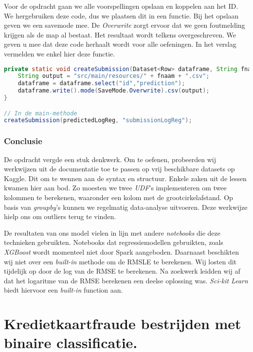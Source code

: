 \documentclass[a4paper,10pt,twoside]{report}
\begin{document}
Voor de opdracht gaan we alle voorspellingen opslaan en koppelen aan het ID. We hergebruiken deze code, dus we plaatsen dit in een functie. Bij het opslaan geven we een savemode mee. De \textit{Overwrite} zorgt ervoor dat we geen foutmelding krijgen als de map al bestaat. Het resultaat wordt telkens overgeschreven. We geven u mee dat deze code herhaalt wordt voor alle oefeningen. In het verslag vermelden we enkel hier deze functie.

\begin{lstlisting}[language=Java]
private static void createSubmission(Dataset<Row> dataframe, String fnaam) {
	String output = "src/main/resources/" + fnaam + ".csv";
	dataframe = dataframe.select("id","prediction");
	dataframe.write().mode(SaveMode.Overwrite).csv(output);
}

// In de main-methode
createSubmission(predictedLogReg, "submissionLogReg");
\end{lstlisting}

\subsection*{Conclusie}

De opdracht vergde een stuk denkwerk. Om te oefenen, probeerden wij werkwijzen uit de documentatie toe te passen op vrij beschikbare datasets op Kaggle. Dit om te wennen aan de syntax en structuur. Enkele zaken uit de lessen kwamen hier aan bod. Zo moesten we twee \textit{UDF}'s implementeren om twee kolommen te berekenen, waaronder een kolom met de grootcirkelafstand. Op basis van \textit{groupby}'s kunnen we regelmatig data-analyse uitvoeren. Deze werkwijze hielp ons om outliers terug te vinden.

De resultaten van ons model vielen in lijn met andere \textit{notebooks} die deze technieken gebruikten. Notebooks dat regressiemodellen gebruikten, zoals \textit{XGBoost} wordt momenteel niet door Spark aangeboden. Daarnaast beschikten wij niet over een \textit{built-in} methode om de RMSLE te berekenen. Wij losten dit tijdelijk op door de log van de RMSE te berekenen. Na zoekwerk leidden wij af dat het logaritme van de RMSE berekenen een deelse oplossing was. \textit{Sci-kit Learn} biedt hiervoor een \textit{built-in} function aan.

\chapter{Kredietkaartfraude bestrijden met binaire classificatie. }
\end{document}

